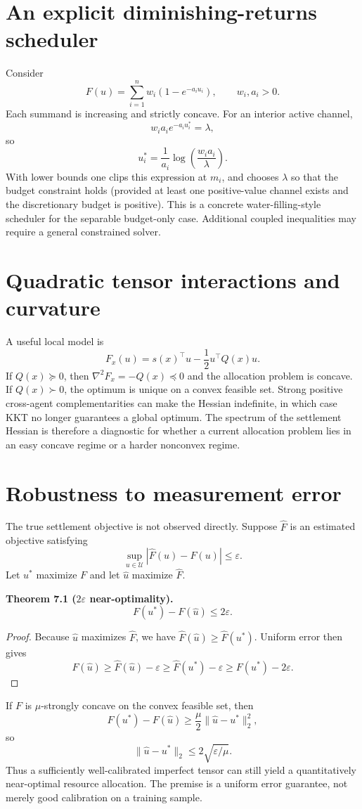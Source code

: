 \documentclass[11pt]{article}
\newcommand{\Uset}{\mathcal U}
\begin{document}
\section{An explicit diminishing-returns scheduler}\label{sec:water-original}
Consider
\[
F(u)=\sum_{i=1}^n w_i(1-e^{-a_i u_i}),\qquad w_i,a_i>0.
\]
Each summand is increasing and strictly concave. For an interior active channel,
\[
w_ia_ie^{-a_i u_i^*}=\lambda,
\]
so
\[
u_i^*=\frac{1}{a_i}\log\left(\frac{w_i a_i}{\lambda}\right).
\]
With lower bounds one clips this expression at $m_i$, and chooses $\lambda$ so that the budget constraint holds (provided at least one positive-value channel exists and the discretionary budget is positive). This is a concrete water-filling-style scheduler for the separable budget-only case. Additional coupled inequalities may require a general constrained solver.

\section{Quadratic tensor interactions and curvature}\label{sec:quadratic}
A useful local model is
\[
F_x(u)=s(x)^\top u-\frac12 u^\top Q(x)u.
\]
If $Q(x)\succeq0$, then $\nabla^2F_x=-Q(x)\preceq0$ and the allocation problem is concave. If $Q(x)\succ0$, the optimum is unique on a convex feasible set. Strong positive cross-agent complementarities can make the Hessian indefinite, in which case KKT no longer guarantees a global optimum. The spectrum of the settlement Hessian is therefore a diagnostic for whether a current allocation problem lies in an easy concave regime or a harder nonconvex regime.

\section{Robustness to measurement error}\label{sec:robust-original}
The true settlement objective is not observed directly. Suppose $\widehat F$ is an estimated objective satisfying
\[
\sup_{u\in\Uset}|\widehat F(u)-F(u)|\le\varepsilon.
\]
Let $u^*$ maximize $F$ and let $\widehat u$ maximize $\widehat F$.

\noindent\textbf{Theorem 7.1 ($2\varepsilon$ near-optimality).}
\[
F(u^*)-F(\widehat u)\le2\varepsilon.
\]
\begin{proof}
Because $\widehat u$ maximizes $\widehat F$, we have $\widehat F(\widehat u)\ge\widehat F(u^*)$. Uniform error then gives
\[
F(\widehat u)\ge\widehat F(\widehat u)-\varepsilon
\ge\widehat F(u^*)-\varepsilon\ge F(u^*)-2\varepsilon.
\]
\end{proof}
If $F$ is $\mu$-strongly concave on the convex feasible set, then
\[
F(u^*)-F(\widehat u)\ge\frac\mu2\|\widehat u-u^*\|_2^2,
\]
so
\[
\|\widehat u-u^*\|_2\le2\sqrt{\varepsilon/\mu}.
\]
Thus a sufficiently well-calibrated imperfect tensor can still yield a quantitatively near-optimal resource allocation. The premise is a uniform error guarantee, not merely good calibration on a training sample.
\end{document}

